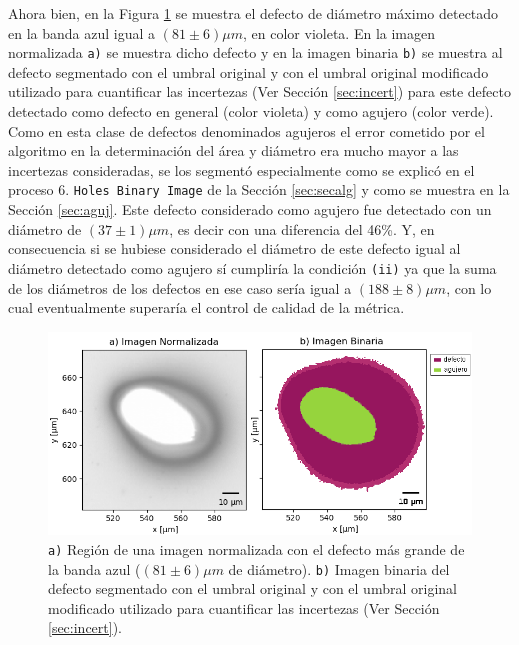  Ahora bien, en la Figura \ref{fig:deffd} se muestra el defecto de diámetro máximo detectado en la banda azul igual a $(81 \pm 6) \mu m$, en color violeta. En la imagen normalizada \texttt{a)} se muestra dicho defecto y en la imagen binaria \texttt{b)} se muestra al defecto segmentado con el umbral original y con el umbral original modificado utilizado para cuantificar las incertezas (Ver Sección \ref{sec:incert}) para este defecto detectado como defecto en general (color violeta) y como agujero (color verde). Como en esta clase de defectos denominados agujeros el error cometido por el algoritmo en la determinación del área y diámetro era mucho mayor a las incertezas consideradas, se los segmentó especialmente como se explicó en el proceso 6. \texttt{Holes Binary Image} de la Sección \ref{sec:secalg} y como se muestra en la Sección \ref{sec:aguj}. Este defecto considerado como agujero fue detectado con un diámetro de $(37 \pm 1)\mu m$, es decir con una diferencia del 46\%. Y, en consecuencia si se hubiese considerado el diámetro de este defecto igual al diámetro detectado como agujero sí cumpliría la condición \texttt{(ii)} ya que la suma de los diámetros de los defectos en ese caso sería igual a $(188 \pm 8) \mu m$, con lo cual eventualmente superaría el control de calidad de la métrica. 
 \begin{figure}
\centering
\includegraphics[scale=1.0]{Figs/cuantificaciondefectos/agujdefectocompar.png}
	\caption{\texttt{a)} Región de una imagen normalizada con el defecto más grande de la banda azul ($(81 \pm 6) \mu m$ de diámetro). \texttt{b)} Imagen binaria del defecto segmentado con el umbral original y con el umbral original modificado utilizado para cuantificar las incertezas (Ver Sección \ref{sec:incert}). }
\label{fig:deffd}
\end{figure}
 
